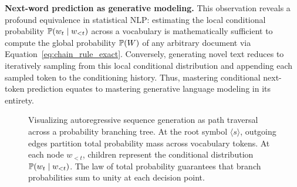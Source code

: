 \documentclass[../../main.tex]{subfiles}
\begin{document}
\noindent\textbf{Next-word prediction as generative modeling.}\newline
This observation reveals a profound equivalence in statistical NLP: estimating the local conditional probability $\mathbb{P}(w_t \mid w_{<t})$ across a vocabulary is mathematically sufficient to compute the global probability $\mathbb{P}(W)$ of any arbitrary document via Equation~\eqref{eq:chain_rule_exact}. Conversely, generating novel text reduces to iteratively sampling from this local conditional distribution and appending each sampled token to the conditioning history. Thus, mastering conditional next-token prediction equates to mastering generative language modeling in its entirety.

\begin{figure}[htbp]
\centering
{}
\caption{Visualizing autoregressive sequence generation as path traversal across a probability branching tree. At the root symbol $\langle s \rangle$, outgoing edges partition total probability mass across vocabulary tokens. At each node $w_{<t}$, children represent the conditional distribution $\mathbb{P}(w_t \mid w_{<t})$. The law of total probability guarantees that branch probabilities sum to unity at each decision point.}
\label{fig:prob_tree}
\end{figure}
\end{document}
